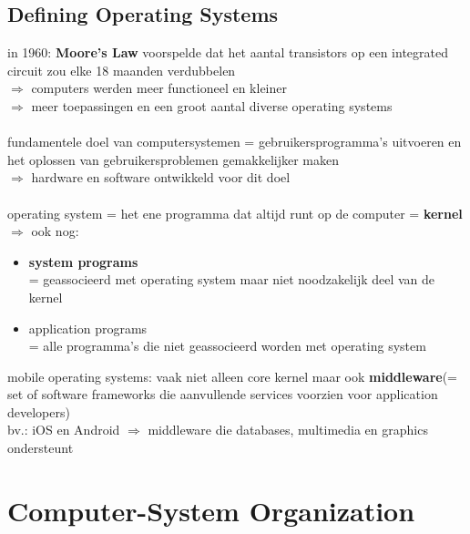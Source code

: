 \documentclass{report}
\begin{document}
\subsection{Defining Operating Systems}
in 1960: \textbf{Moore's Law} voorspelde dat het aantal transistors op een integrated circuit zou elke 18 maanden verdubbelen
\\$\Rightarrow$ computers werden meer functioneel en kleiner 
\\$\Rightarrow$ meer toepassingen en een groot aantal diverse operating systems
\\
\\fundamentele doel van computersystemen = gebruikersprogramma's uitvoeren en het oplossen van gebruikersproblemen gemakkelijker maken
\\ $\Rightarrow$ hardware en software ontwikkeld voor dit doel
\\
\\operating system = het ene programma dat altijd runt op de computer = \textbf{kernel}
\\$\Rightarrow$ ook nog: 
\begin{itemize}
\item \textbf{system programs}
\\= geassocieerd met operating system maar niet noodzakelijk deel van de kernel
\item application programs
\\= alle programma's die niet geassocieerd worden met operating system
\end{itemize}
mobile operating systems: vaak niet alleen core kernel maar ook \textbf{middleware}(= set of software frameworks die aanvullende services voorzien voor application developers)
\\bv.: iOS en Android $\Rightarrow$ middleware die databases, multimedia en graphics ondersteunt

\section{Computer-System Organization}
\end{document}
